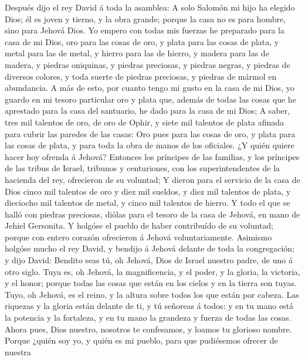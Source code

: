  Después dijo el rey David á toda la asamblea: A solo
Salomón mi hijo ha elegido Dios; él es joven y tierno, y la obra grande;
porque la casa no es para hombre, sino para Jehová Dios.  Yo
empero con todas mis fuerzas he preparado para la casa de mi Dios, oro
para las cosas de oro, y plata para las cosas de plata, y metal para las
de metal, y hierro para las de hierro, y madera para las de madera, y
piedras oniquinas, y piedras preciosas, y piedras negras, y piedras de
diversos colores, y toda suerte de piedras preciosas, y piedras de
mármol en abundancia.  A más de esto, por cuanto tengo mi
gusto en la casa de mi Dios, yo guardo en mi tesoro particular oro y
plata que, además de todas las cosas que he aprestado para la casa del
santuario, he dado para la casa de mi Dios;  A saber, tres
mil talentos de oro, de oro de Ophir, y siete mil talentos de plata
afinada para cubrir las paredes de las casas:  Oro pues para
las cosas de oro, y plata para las cosas de plata, y para toda la obra
de manos de los oficiales. ¿Y quién quiere hacer hoy ofrenda á Jehová?
 Entonces los príncipes de las familias, y los príncipes de
las tribus de Israel, tribunos y centuriones, con los superintendentes
de la hacienda del rey, ofrecieron de su voluntad;  Y dieron
para el servicio de la casa de Dios cinco mil talentos de oro y diez mil
sueldos, y diez mil talentos de plata, y dieciocho mil talentos de
metal, y cinco mil talentos de hierro.  Y todo el que se
halló con piedras preciosas, diólas para el tesoro de la casa de Jehová,
en mano de Jehiel Gersonita.  Y holgóse el pueblo de haber
contribuído de su voluntad; porque con entero corazón ofrecieron á
Jehová voluntariamente.  Asimismo holgóse mucho el rey
David, y bendijo á Jehová delante de toda la congregación; y dijo David:
Bendito seas tú, oh Jehová, Dios de Israel nuestro padre, de uno á otro
siglo.  Tuya es, oh Jehová, la magnificencia, y el poder, y
la gloria, la victoria, y el honor; porque todas las cosas que están en
los cielos y en la tierra son tuyas. Tuyo, oh Jehová, es el reino, y la
altura sobre todos los que están por cabeza.  Las riquezas
y la gloria están delante de ti, y tú señoreas á todos: y en tu mano
está la potencia y la fortaleza, y en tu mano la grandeza y fuerza de
todas las cosas.  Ahora pues, Dios nuestro, nosotros te
confesamos, y loamos tu glorioso nombre.  Porque ¿quién soy
yo, y quién es mi pueblo, para que pudiésemos ofrecer de nuestra
